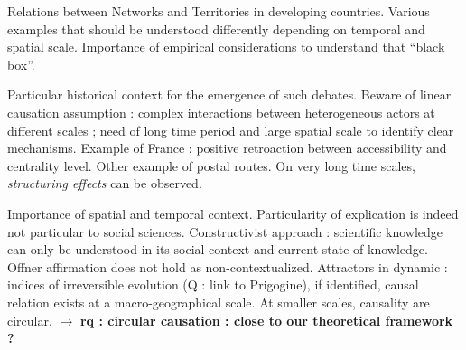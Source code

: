  Relations between Networks and Territories in developing countries. Various examples that should be understood differently depending on temporal and spatial scale. Importance of empirical considerations to understand that ``black box''.


 Particular historical context for the emergence of such debates. Beware of linear causation assumption : complex interactions between heterogeneous actors at different scales ; need of long time period and large spatial scale to identify clear mechanisms. Example of France : positive retroaction between accessibility and centrality level. Other example of postal routes. On very long time scales, \emph{structuring effects} can be observed.

 Importance of spatial and temporal context. Particularity of explication is indeed not particular to social sciences. Constructivist approach : scientific knowledge can only be understood in its social context and current state of knowledge. Offner affirmation does not hold as non-contextualized. Attractors in dynamic : indices of irreversible evolution (Q : link to Prigogine), if identified, causal relation exists at a macro-geographical scale. At smaller scales, causality are circular. $\rightarrow$ \textbf{rq : circular causation : close to our theoretical framework ?}



















